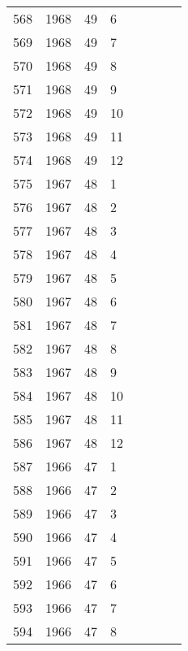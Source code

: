 \begin{longtable}{ |l|l|l|l|l|l|l|l| }
568 & 1968 & 49 &     6 &         &                &  & \\
569 & 1968 & 49 &     7 &         &                &  & \\
570 & 1968 & 49 &     8 &         &                &  & \\
571 & 1968 & 49 &     9 &         &                &  & \\
572 & 1968 & 49 &    10 &         &                &  & \\
573 & 1968 & 49 &    11 &         &                &  & \\
574 & 1968 & 49 &    12 &         &                &  & \\
575 & 1967 & 48 &     1 &         &                &  & \\
576 & 1967 & 48 &     2 &         &                &  & \\
577 & 1967 & 48 &     3 &         &                &  & \\
578 & 1967 & 48 &     4 &         &                &  & \\
579 & 1967 & 48 &     5 &         &                &  & \\
580 & 1967 & 48 &     6 &         &                &  & \\
581 & 1967 & 48 &     7 &         &                &  & \\
582 & 1967 & 48 &     8 &         &                &  & \\
583 & 1967 & 48 &     9 &         &                &  & \\
584 & 1967 & 48 &    10 &         &                &  & \\
585 & 1967 & 48 &    11 &         &                &  & \\
586 & 1967 & 48 &    12 &         &                &  & \\
587 & 1966 & 47 &     1 &         &                &  & \\
588 & 1966 & 47 &     2 &         &                &  & \\
589 & 1966 & 47 &     3 &         &                &  & \\
590 & 1966 & 47 &     4 &         &                &  & \\
591 & 1966 & 47 &     5 &         &                &  & \\
592 & 1966 & 47 &     6 &         &                &  & \\
593 & 1966 & 47 &     7 &         &                &  & \\
594 & 1966 & 47 &     8 &         &                &  & \\

\end{longtable}
